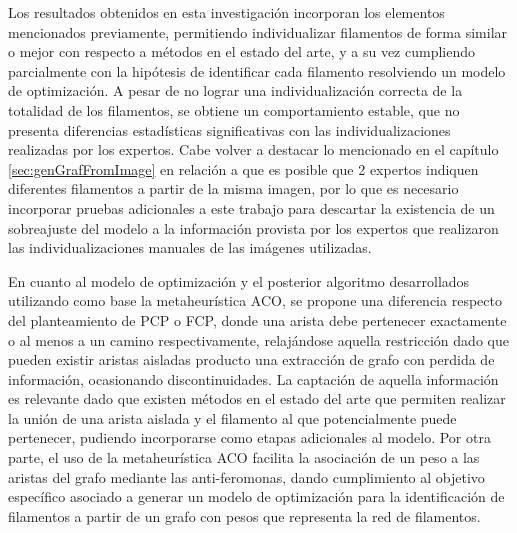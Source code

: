 Los resultados obtenidos en esta investigaci\'on incorporan los elementos mencionados previamente, permitiendo individualizar filamentos de forma similar o mejor con respecto a m\'etodos en el estado del arte, y a su vez cumpliendo parcialmente con la hip\'otesis de identificar cada filamento resolviendo un modelo de optimizaci\'on. A pesar de no lograr una individualizaci\'on correcta de la totalidad de los filamentos, se obtiene un comportamiento estable, que no presenta diferencias estad\'isticas significativas con las individualizaciones realizadas por los expertos. Cabe volver a destacar lo mencionado en el cap\'itulo \ref{sec:genGrafFromImage} en relaci\'on a que es posible que 2 expertos indiquen diferentes filamentos a partir de la misma imagen, por lo que es necesario incorporar pruebas adicionales a este trabajo para descartar la existencia de un sobreajuste del modelo a la informaci\'on provista por los expertos que realizaron las individualizaciones manuales de las im\'agenes utilizadas.


En cuanto al modelo de optimizaci\'on y el posterior algoritmo desarrollados utilizando como base la metaheur\'istica ACO, se propone una diferencia respecto del planteamiento de PCP o FCP, donde una arista debe pertenecer exactamente o al menos a un camino respectivamente, relaj\'andose aquella restricci\'on dado que pueden existir aristas aisladas producto una extracci\'on de grafo con perdida de informaci\'on, ocasionando discontinuidades. La captaci\'on de aquella informaci\'on es relevante dado que existen m\'etodos en el estado del arte que permiten realizar la uni\'on de una arista aislada y el filamento al que potencialmente puede pertenecer, pudiendo incorporarse como etapas adicionales al modelo.
Por otra parte, el uso de la metaheur\'istica ACO facilita la asociaci\'on de un peso a las aristas del grafo mediante las anti-feromonas, dando cumplimiento al objetivo espec\'ifico asociado a generar un modelo de optimizaci\'on para la identificaci\'on de filamentos a partir de un grafo con pesos que representa la red de filamentos.


